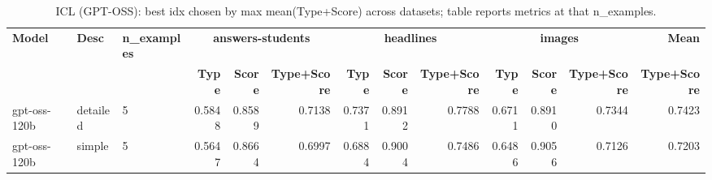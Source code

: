 \begin{table}[t]
\centering
\scriptsize
\setlength{\tabcolsep}{3.2pt}
\begin{adjustbox}{width=\textwidth}
\begin{tabular}{l l l r r r r r r r r r r}
\hline
\textbf{Model} & \textbf{Desc} & \textbf{n_examples} & \multicolumn{3}{c}{\textbf{answers-students}} & \multicolumn{3}{c}{\textbf{headlines}} & \multicolumn{3}{c}{\textbf{images}} & \textbf{Mean} \\
 &  &  & \textbf{Type} & \textbf{Score} & \textbf{Type+Score} & \textbf{Type} & \textbf{Score} & \textbf{Type+Score} & \textbf{Type} & \textbf{Score} & \textbf{Type+Score} & \textbf{Type+Score} \\
\hline
gpt-oss-120b & detailed & 5 & 0.5848 & 0.8589 & 0.7138 & 0.7371 & 0.8912 & 0.7788 & 0.6711 & 0.8910 & 0.7344 & 0.7423 \\
gpt-oss-120b & simple & 5 & 0.5647 & 0.8664 & 0.6997 & 0.6884 & 0.9004 & 0.7486 & 0.6486 & 0.9056 & 0.7126 & 0.7203 \\
\hline
\end{tabular}
\end{adjustbox}
\caption{ICL (GPT-OSS): best idx chosen by max mean(Type+Score) across datasets; table reports metrics at that n_examples.}
\end{table}